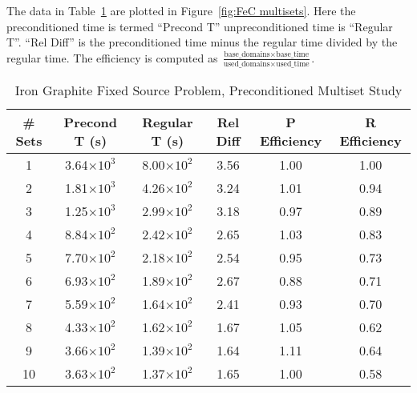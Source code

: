 The data in Table~\ref{table:FeC multisets} are plotted in Figure~\ref{fig:FeC multisets}. Here the preconditioned time is termed ``Precond T''  unpreconditioned time is ``Regular T''. ``Rel Diff'' is the preconditioned time minus the regular time divided by the regular time. The efficiency is computed as $\frac{\text{base\_domains}\times\text{base\_time}}{\text{used\_domains}\times\text{used\_time}}$.
\begin{table}[!h]
\caption{Iron Graphite Fixed Source Problem, Preconditioned Multiset Study}
\begin{center}
\begin{tabular}{|c |c |c |c |c |c|}
\hline
\# Sets & Precond T (s) & Regular T (s) & Rel Diff & P Efficiency & R Efficiency \\[0.5ex]
\hline
1   & 3.64$\times 10^{3}$  & 8.00$\times 10^{2}$ & 3.56 & 1.00 & 1.00 \\
2   & 1.81$\times 10^{3}$	& 4.26$\times 10^{2}$ & 3.24 & 1.01 & 0.94 \\
3   & 1.25$\times 10^{3}$	& 2.99$\times 10^{2}$ & 3.18 & 0.97 & 0.89 \\
4   & 8.84$\times 10^{2}$	& 2.42$\times 10^{2}$ & 2.65 & 1.03 & 0.83 \\ 
5   & 7.70$\times 10^{2}$	& 2.18$\times 10^{2}$ & 2.54 & 0.95 & 0.73 \\
6   & 6.93$\times 10^{2}$	& 1.89$\times 10^{2}$ & 2.67 & 0.88 & 0.71 \\
7   & 5.59$\times 10^{2}$	& 1.64$\times 10^{2}$ & 2.41 & 0.93 & 0.70 \\
8   & 4.33$\times 10^{2}$	& 1.62$\times 10^{2}$ & 1.67 & 1.05 & 0.62 \\
9   & 3.66$\times 10^{2}$	& 1.39$\times 10^{2}$ & 1.64 & 1.11 & 0.64 \\
10 & 3.63$\times 10^{2}$	& 1.37$\times 10^{2}$ & 1.65 & 1.00 & 0.58 \\
\hline 
\end{tabular} 
\end{center}
\label{table:FeC multisets}
\end{table}

